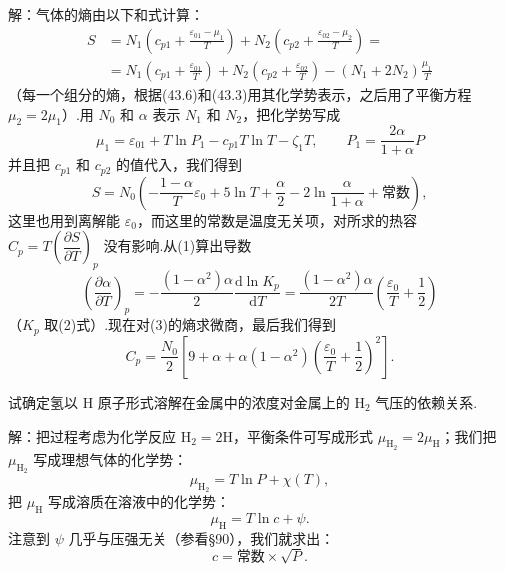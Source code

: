 \begin{xiti}
解：气体的熵由以下和式计算：
\begin{equation*}
\begin{aligned}
  S&=N_1\left(c_{p1}+\frac{\varepsilon_{01}-\mu_1}{T}\right)
  +N_2\left(c_{p2}+\frac{\varepsilon_{02}-\mu_2}{T}\right)=\\
  &=N_1\left(c_{p1}+\frac{\varepsilon_{01}}{T}\right)
  +N_2\left(c_{p2}+\frac{\varepsilon_{02}}{T}\right)
  -(N_1+2N_2)\frac{\mu_1}{T}
\end{aligned}
\end{equation*}
（每一个组分的熵，根据(43.6)和(43.3)用其化学势表示，之后用了平衡方程 $\mu_2=2\mu_1$）.用 $N_0$ 和 $\alpha$ 表示 $N_1$ 和 $N_2$，把化学势写成
\begin{equation*}
  \mu_1=\varepsilon_{01}+T\ln P_1-c_{p1}T\ln T-\zeta_1T,
  \qquad P_1=\frac{2\alpha}{1+\alpha}P
\end{equation*}
并且把 $c_{p1}$ 和 $c_{p2}$ 的值代入，我们得到
\begin{equation*}
  S=N_0\left(-\frac{1-\alpha}{T}\varepsilon_0+5\ln T+\frac{\alpha}{2}
  -2\ln\frac{\alpha}{1+\alpha}+\text{常数}\right),\tag{3}
\end{equation*}
这里也用到离解能 $\varepsilon_0$，而这里的常数是温度无关项，对所求的热容 $C_p=T\left(\dfrac{\partial S}{\partial T}\right)_p$ 没有影响.从(1)算出导数
\begin{equation*}
  \left(\frac{\partial\alpha}{\partial T}\right)_p
  =-\frac{(1-\alpha^2)\alpha}{2}\frac{\mathrm{d}\ln K_p}{\mathrm{d}T}
  =\frac{(1-\alpha^2)\alpha}{2T}
  \left(\frac{\varepsilon_0}{T}+\frac12\right)
\end{equation*}
（$K_p$ 取(2)式）.现在对(3)的熵求微商，最后我们得到
\begin{equation*}
  C_p=\frac{N_0}{2}\left[9+\alpha+\alpha(1-\alpha^2)
  \left(\frac{\varepsilon_0}{T}+\frac12\right)^2\right].
\end{equation*}

\quad 试确定氢以 $\mathrm{H}$ 原子形式溶解在金属中的浓度对金属上的 $\mathrm{H}_2$ 气压的依赖关系.

解：把过程考虑为化学反应 $\mathrm{H}_2=2\mathrm{H}$，平衡条件可写成形式 $\mu_{\mathrm{H}_2}=2\mu_{\mathrm{H}}$；我们把 $\mu_{\mathrm{H}_2}$ 写成理想气体的化学势：
\begin{equation*}
  \mu_{\mathrm{H}_2}=T\ln P+\chi(T),
\end{equation*}
把 $\mu_{\mathrm{H}}$ 写成溶质在溶液中的化学势：
\begin{equation*}
  \mu_{\mathrm{H}}=T\ln c+\psi.
\end{equation*}
注意到 $\psi$ 几乎与压强无关（参看§90），我们就求出：
\begin{equation*}
  c=\text{常数}\times\sqrt{P}.
\end{equation*}

\end{xiti}

